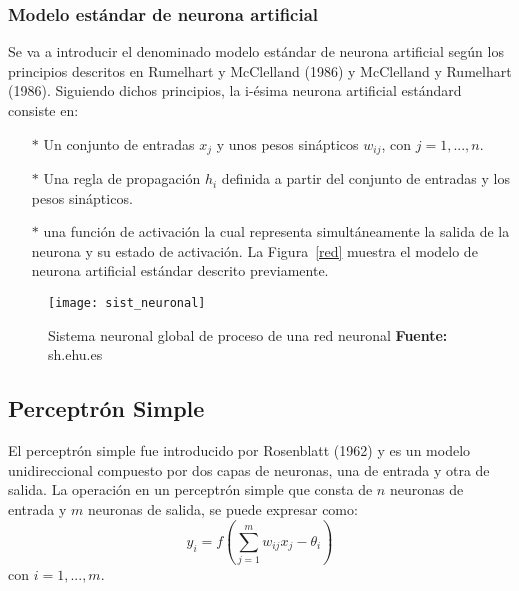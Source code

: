 \documentclass[10pt,a4paper]{article}
\begin{document}
\subsubsection{Modelo estándar de neurona artificial}
Se va a introducir el denominado modelo estándar de neurona artificial según los
principios descritos en Rumelhart y McClelland (1986) y McClelland y Rumelhart (1986). Siguiendo dichos principios, la i-ésima neurona artificial estándard
consiste en:
\begin{itemize}
\item[$*$] Un conjunto de entradas $x_j$ y unos pesos sinápticos $w_{ij}$, con $j=1,...,n$.
\item[$*$] Una regla de propagación $h_i$ definida a partir del conjunto de entradas y los pesos sinápticos.
\item[$*$] una función de activación la cual representa simultáneamente la salida de
la neurona y su estado de activación.
La Figura~\ref{red} muestra el modelo de neurona artificial estándar descrito previamente.
\end{itemize}

\begin{figure}[H]
\centering
\texttt{[image: sist\_neuronal]}
\caption{Sistema neuronal global de proceso de una red neuronal {\scriptsize \textbf{Fuente: }sh.ehu.es}}
\label{sistema}
\end{figure}

	



\subsection{Perceptrón Simple}
El perceptrón simple fue introducido por Rosenblatt (1962) y es un modelo unidireccional compuesto por dos capas de neuronas, una de entrada y otra de salida. La operación en un perceptrón simple que consta de $n$ neuronas de entrada y $m$ neuronas de salida, se puede expresar como:
\begin{equation}
y_i=f \left(\sum_{j=1}^{m} w_{ij} x_j - \theta_i \right)
\end{equation}
con $i=1,...,m$.\\
\end{document}
